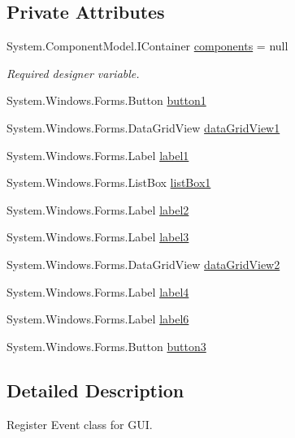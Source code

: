 \subsection*{Private Attributes}
\begin{DoxyCompactItemize}
\item 
System.\+Component\+Model.\+I\+Container \hyperlink{classPCO_1_1RegisterEventForm_a8f1ca27e2a7a4f9ade18a13d56998a0b}{components} = null
\begin{DoxyCompactList}\small\item\em Required designer variable. \end{DoxyCompactList}\item 
System.\+Windows.\+Forms.\+Button \hyperlink{classPCO_1_1RegisterEventForm_a50716d1df1ea09211dd8155dd88b5a66}{button1}
\item 
System.\+Windows.\+Forms.\+Data\+Grid\+View \hyperlink{classPCO_1_1RegisterEventForm_a2be47e5a60fb5506df1307807366c8ca}{data\+Grid\+View1}
\item 
System.\+Windows.\+Forms.\+Label \hyperlink{classPCO_1_1RegisterEventForm_a5577702159a5e263ebd05437858c5938}{label1}
\item 
System.\+Windows.\+Forms.\+List\+Box \hyperlink{classPCO_1_1RegisterEventForm_a4aa0fbf4f9a911ecb9bf49c3faeb8b6f}{list\+Box1}
\item 
System.\+Windows.\+Forms.\+Label \hyperlink{classPCO_1_1RegisterEventForm_a0f33601b50ff6b0fb27db8cee8e7e720}{label2}
\item 
System.\+Windows.\+Forms.\+Label \hyperlink{classPCO_1_1RegisterEventForm_a82b433a24269949b193cd9d4355aeb7a}{label3}
\item 
System.\+Windows.\+Forms.\+Data\+Grid\+View \hyperlink{classPCO_1_1RegisterEventForm_ad30c29750ae517dbd905e8818c610ff9}{data\+Grid\+View2}
\item 
System.\+Windows.\+Forms.\+Label \hyperlink{classPCO_1_1RegisterEventForm_ab527a509bbafc3e11d4f35fe460e6f07}{label4}
\item 
System.\+Windows.\+Forms.\+Label \hyperlink{classPCO_1_1RegisterEventForm_a383bb27e38a7a0b184f3b98ee0c65527}{label6}
\item 
System.\+Windows.\+Forms.\+Button \hyperlink{classPCO_1_1RegisterEventForm_a995acb0035930be1f1539a80de5bcad9}{button3}
\end{DoxyCompactItemize}


\subsection{Detailed Description}
Register Event class for G\+UI. 

